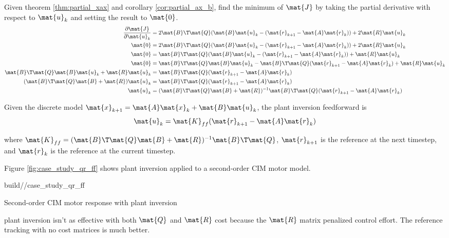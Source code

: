 Given theorem \ref{thm:partial_xax} and corollary \ref{cor:partial_ax_b}, find
the minimum of $\mat{J}$ by taking the partial derivative with respect to
$\mat{u}_k$ and setting the result to $\mat{0}$.
\begin{align*}
  \frac{\partial\mat{J}}{\partial\mat{u}_k} &= 2\mat{B}\T\mat{Q}
    (\mat{B}\mat{u}_k - (\mat{r}_{k+1} - \mat{A}\mat{r}_k)) +
    2\mat{R}\mat{u}_k \\
  \mat{0} &= 2\mat{B}\T\mat{Q}
    (\mat{B}\mat{u}_k - (\mat{r}_{k+1} - \mat{A}\mat{r}_k)) +
    2\mat{R}\mat{u}_k \\
  \mat{0} &= \mat{B}\T\mat{Q}
    (\mat{B}\mat{u}_k - (\mat{r}_{k+1} - \mat{A}\mat{r}_k)) +
    \mat{R}\mat{u}_k \\
  \mat{0} &= \mat{B}\T\mat{Q}\mat{B}\mat{u}_k -
    \mat{B}\T\mat{Q}(\mat{r}_{k+1} - \mat{A}\mat{r}_k) + \mat{R}\mat{u}_k \\
  \mat{B}\T\mat{Q}\mat{B}\mat{u}_k + \mat{R}\mat{u}_k &=
    \mat{B}\T\mat{Q}(\mat{r}_{k+1} - \mat{A}\mat{r}_k) \\
  (\mat{B}\T\mat{Q}\mat{B} + \mat{R})\mat{u}_k &=
    \mat{B}\T\mat{Q}(\mat{r}_{k+1} - \mat{A}\mat{r}_k) \\
  \mat{u}_k &= (\mat{B}\T\mat{Q}\mat{B} + \mat{R})^{-1}
    \mat{B}\T\mat{Q}(\mat{r}_{k+1} - \mat{A}\mat{r}_k)
\end{align*}
\begin{theorem}
  Given the discrete model
  $\mat{x}_{k+1} = \mat{A}\mat{x}_k + \mat{B}\mat{u}_k$, the plant inversion
  feedforward is
  \begin{equation*}
    \mat{u}_k = \mat{K}_{ff} (\mat{r}_{k+1} - \mat{A}\mat{r}_k)
  \end{equation*}

  where
  $\mat{K}_{ff} = (\mat{B}\T\mat{Q}\mat{B} + \mat{R})^{-1}\mat{B}\T\mat{Q}$,
  $\mat{r}_{k+1}$ is the reference at the next timestep, and $\mat{r}_k$ is the
  reference at the current timestep.
\end{theorem}

Figure \ref{fig:case_study_qr_ff} shows \gls{plant} inversion applied to a
second-order CIM motor model.
\begin{svg}{build/\partpath/case_study_qr_ff}
  \caption{Second-order CIM motor response with plant inversion}
  \label{fig:case_study_qr_ff}
\end{svg}

\Gls{plant} inversion isn't as effective with both $\mat{Q}$ and $\mat{R}$ cost
because the $\mat{R}$ matrix penalized \gls{control effort}. The \gls{reference}
\gls{tracking} with no cost matrices is much better.
